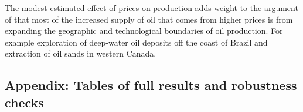 \documentclass[11pt]{article}
\begin{document}
The modest estimated effect of prices on production adds weight to the argument of \citet{hamilton_oil_2012} that most of the increased supply of oil that comes from higher prices is from expanding the geographic and technological boundaries of oil production.  For example exploration of deep-water oil deposits off the coast of Brazil and extraction of oil sands in western Canada.   

 \begin{spacing}{1}




\FloatBarrier

\appendix

\section{Appendix: Tables of full results and robustness checks}


\end{spacing}
\end{document}
